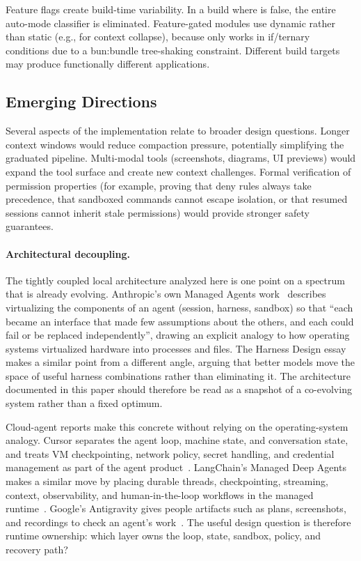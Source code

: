Feature flags create build-time variability. In a build where  is false, the entire auto-mode classifier is eliminated. Feature-gated modules use dynamic  rather than static  (e.g.,  for context collapse), because  only works in if/ternary conditions due to a bun:bundle tree-shaking constraint. Different build targets may produce functionally different applications.

\subsection{Emerging Directions}
\label{sec:discuss:future}

Several aspects of the implementation relate to broader design questions. Longer context windows would reduce compaction pressure, potentially simplifying the graduated pipeline. Multi-modal tools (screenshots, diagrams, UI previews) would expand the tool surface and create new context challenges. Formal verification of permission properties (for example, proving that deny rules always take precedence, that sandboxed commands cannot escape isolation, or that resumed sessions cannot inherit stale permissions) would provide stronger safety guarantees.

\paragraph{Architectural decoupling.}
The tightly coupled local architecture analyzed here is one point on a spectrum that is already evolving. Anthropic's own Managed Agents work~\citep{anthropic2026managed} describes virtualizing the components of an agent (session, harness, sandbox) so that ``each became an interface that made few assumptions about the others, and each could fail or be replaced independently'', drawing an explicit analogy to how operating systems virtualized hardware into processes and files. The Harness Design essay~\citep{anthropic2026harness} makes a similar point from a different angle, arguing that better models move the space of useful harness combinations rather than eliminating it. The architecture documented in this paper should therefore be read as a snapshot of a co-evolving system rather than a fixed optimum.

Cloud-agent reports make this concrete without relying on the operating-system analogy. Cursor separates the agent loop, machine state, and conversation state, and treats VM checkpointing, network policy, secret handling, and credential management as part of the agent product~\citep{cursor2026cloudagents}. LangChain's Managed Deep Agents makes a similar move by placing durable threads, checkpointing, streaming, context, observability, and human-in-the-loop workflows in the managed runtime~\citep{langchain2026manageddeepagents}. Google's Antigravity gives people artifacts such as plans, screenshots, and recordings to check an agent's work~\citep{google2026antigravity}. The useful design question is therefore runtime ownership: which layer owns the loop, state, sandbox, policy, and recovery path?

